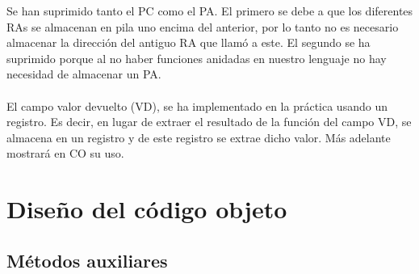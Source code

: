 \documentclass[11pt, , a4paper, titlepage]{article}
\begin{document}
Se han suprimido tanto el PC como el PA. El primero se debe a que los diferentes RAs se almacenan
en pila uno encima del anterior, por lo tanto no es necesario almacenar la dirección del antiguo RA que llamó a este.
El segundo se ha suprimido porque al no haber funciones anidadas en nuestro lenguaje no hay necesidad de almacenar un PA. \\ \\
El campo valor devuelto (VD), se ha implementado en la práctica usando un registro. Es decir, en lugar de extraer el resultado de la función
del campo VD, se almacena en un registro y de este registro se extrae dicho valor. Más adelante mostrará en CO su uso.

\clearpage

\section{Diseño del código objeto}

\subsection{Métodos auxiliares}
\end{document}
